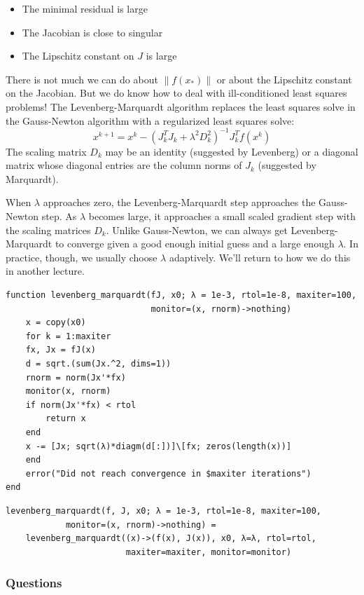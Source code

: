 \documentclass[12pt, leqno]{article} %
\providecommand{\tightlist}{%
  \setlength{\itemsep}{0pt}\setlength{\parskip}{0pt}}
\begin{document}
\begin{itemize}
\tightlist
\item
  The minimal residual is large
\item
  The Jacobian is close to singular
\item
  The Lipschitz constant on \(J\) is large
\end{itemize}

There is not much we can do about \(\|f(x_*)\|\) or about the Lipschitz
constant on the Jacobian. But we do know how to deal with
ill-conditioned least squares problems! The Levenberg-Marquardt
algorithm replaces the least squares solve in the Gauss-Newton algorithm
with a regularized least squares solve:
\[x^{k+1} = x^k - (J_k^T J_k + \lambda^2 D_k^2)^{-1} J_k^T f(x^k)\] The
scaling matrix \(D_k\) may be an identity (suggested by Levenberg) or a
diagonal matrix whose diagonal entries are the column norms of \(J_k\)
(suggested by Marquardt).

When \(\lambda\) approaches zero, the Levenberg-Marquardt step
approaches the Gauss-Newton step. As \(\lambda\) becomes large, it
approaches a small scaled gradient step with the scaling matrices
\(D_k\). Unlike Gauss-Newton, we can always get Levenberg-Marquardt to
converge given a good enough initial guess and a large enough
\(\lambda\). In practice, though, we usually choose \(\lambda\)
adaptively. We'll return to how we do this in another lecture.

\begin{verbatim}
function levenberg_marquardt(fJ, x0; λ = 1e-3, rtol=1e-8, maxiter=100,
                             monitor=(x, rnorm)->nothing)
    x = copy(x0)
    for k = 1:maxiter
	fx, Jx = fJ(x)
	d = sqrt.(sum(Jx.^2, dims=1))
	rnorm = norm(Jx'*fx)
	monitor(x, rnorm)
	if norm(Jx'*fx) < rtol
	    return x
	end
	x -= [Jx; sqrt(λ)*diagm(d[:])]\[fx; zeros(length(x))]
    end
    error("Did not reach convergence in $maxiter iterations")
end
\end{verbatim}

\begin{verbatim}
levenberg_marquardt(f, J, x0; λ = 1e-3, rtol=1e-8, maxiter=100, 
		    monitor=(x, rnorm)->nothing) =
    levenberg_marquardt((x)->(f(x), J(x)), x0, λ=λ, rtol=rtol,
                        maxiter=maxiter, monitor=monitor)
\end{verbatim}

\subsubsection{Questions}
\end{document}
